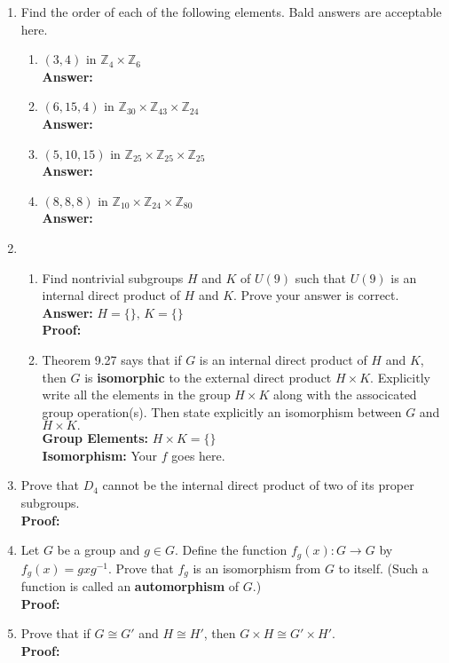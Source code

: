 \documentclass[12pt]{article}
\renewcommand{\emph}[1]{\textsf{\textbf{#1}}}
\newcommand{\bbZ}{\mathbb{Z}}
\begin{document}
\begin{enumerate}
\item Find the order of each of the following elements. Bald answers are acceptable here.\\
	\begin{enumerate}
	\item $(3,4)$ in $\bbZ_4 \times \bbZ_6$\\
	\textbf{Answer:}
	\vfill
	\item $(6,15,4)$ in $\bbZ_{30} \times \bbZ_{43} \times \bbZ_{24}$\\
	\textbf{Answer:}
	\vfill
	\item $(5,10,15)$ in $\bbZ_{25} \times \bbZ_{25} \times \bbZ_{25}$\\
	\textbf{Answer:}
	\vfill
	\item $(8,8,8)$ in $\bbZ_{10} \times \bbZ_{24} \times \bbZ_{80}$\\
	\textbf{Answer:}
	\vfill
	\end{enumerate}
\newpage
\item 
	\begin{enumerate}
	\item Find nontrivial subgroups $H$ and $K$ of $U(9)$ such that $U(9)$ is an internal direct product of $H$ and $K$. Prove your answer is correct.\\
	\textbf{Answer:} $H=\{\}, \, K=\{\}$\\
	\textbf{Proof:}
	\vfill
	\item Theorem 9.27 says that if $G$ is an internal direct product of $H$ and $K$, then $G$ is \emph{isomorphic} to the external direct product $H \times K.$ Explicitly write all the elements in the group  $H \times K$ along with the associcated group operation(s). Then state explicitly an isomorphism between $G$ and $H \times K.$\\
	\textbf{Group Elements:} $H \times K=\{\}$\\
	\textbf{Isomorphism:} Your $f$ goes here.
	\vfill
	\end{enumerate}
\item Prove that $D_4$ cannot be the internal direct product of two of its proper subgroups.\\
\textbf{Proof:}\\
\vfill
\newpage
\item Let $G$ be a group and $g \in G.$ Define the function $f_g(x) : G \to G$ by $f_g(x)=gxg^{-1}.$ Prove that $f_g$ is an isomorphism from $G$ to itself. (Such a function is called an \emph{automorphism} of $G$.)\\
\textbf{Proof:}\\
\vfill

\item Prove that if $G \cong G'$ and $H \cong H'$, then $G \times H \cong G' \times H'.$\\

\textbf{Proof:}\\
\vfill
\end{enumerate}
\end{document}
